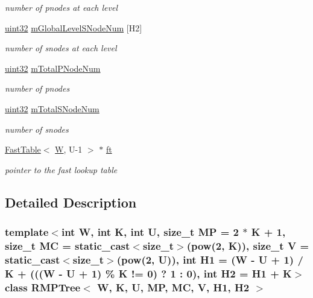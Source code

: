 \begin{DoxyCompactItemize}
\begin{DoxyCompactList}\small\item\em number of pnodes at each level \end{DoxyCompactList}\item 
\hyperlink{types_8h_abd01e8e67e3d94cab04ecaaf4f85ac1b}{uint32} \hyperlink{classRMPTree_a2435f801f07587babed1853cdb04b078}{m\-Global\-Level\-S\-Node\-Num} \mbox{[}H2\mbox{]}
\begin{DoxyCompactList}\small\item\em number of snodes at each level \end{DoxyCompactList}\item 
\hyperlink{types_8h_abd01e8e67e3d94cab04ecaaf4f85ac1b}{uint32} \hyperlink{classRMPTree_a583509c36d3ec16fe35ca64ae7d71977}{m\-Total\-P\-Node\-Num}
\begin{DoxyCompactList}\small\item\em number of pnodes \end{DoxyCompactList}\item 
\hyperlink{types_8h_abd01e8e67e3d94cab04ecaaf4f85ac1b}{uint32} \hyperlink{classRMPTree_af7293f2b7c8212daaccc3d014a9ca089}{m\-Total\-S\-Node\-Num}
\begin{DoxyCompactList}\small\item\em number of snodes \end{DoxyCompactList}\item 
\hyperlink{structFastTable}{Fast\-Table}$<$ \hyperlink{test__u128_8cpp_ab21b528bc38899d04d3a7053e52fb797}{W}, U-\/1 $>$ $\ast$ \hyperlink{classRMPTree_ad94614dd338215403c0e46d8f3bed5e1}{ft}
\begin{DoxyCompactList}\small\item\em pointer to the fast lookup table \end{DoxyCompactList}\end{DoxyCompactItemize}


\subsection{Detailed Description}
\subsubsection*{template$<$int W, int K, int U, size\-\_\-t M\-P = 2 $\ast$ K + 1, size\-\_\-t M\-C = static\-\_\-cast$<$size\-\_\-t$>$(pow(2, K)), size\-\_\-t V = static\-\_\-cast$<$size\-\_\-t$>$(pow(2, U)), int H1 = (\-W -\/ U + 1) / K + (((\-W -\/ U + 1) \% K != 0) ? 1 \-: 0), int H2 = H1 + K$>$class R\-M\-P\-Tree$<$ W, K, U, M\-P, M\-C, V, H1, H2 $>$}

